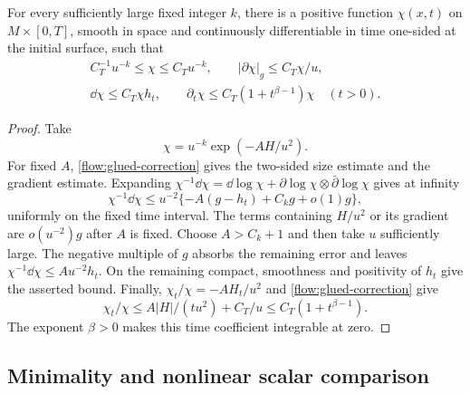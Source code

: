 \begin{lemma}\label{flow:cutoff-lemma}
For every sufficiently large fixed integer $k$, there is a positive
function $\chi(x,t)$ on $M\times[0,T]$, smooth in space and continuously
differentiable in time one-sided at the initial surface, such that
\begin{equation}\label{flow:cutoff-bounds}
 \begin{gathered}
 C_T^{-1}u^{-k}\le\chi\le C_Tu^{-k},\qquad
 |\partial\chi|_g\le C_T\chi/u,\\
 \dd\chi\le C_T\chi h_t,
 \qquad \partial_t\chi\le C_T(1+t^{\beta-1})\chi
 \quad(t>0).
 \end{gathered}
\end{equation}
\end{lemma}

\begin{proof}
Take
\[
 \chi=u^{-k}\exp(-AH/u^2).
\]
For fixed $A$, \eqref{flow:glued-correction} gives the two-sided
size estimate and the gradient estimate.  Expanding
$\chi^{-1}\dd\chi=\dd\log\chi+
\partial\log\chi\otimes\bar\partial\log\chi$ gives at infinity
\[
 \chi^{-1}\dd\chi
 \le u^{-2}\{-A(g-h_t)+C_kg+o(1)g\},
\]
uniformly on the fixed time interval.  The terms containing
$H/u^2$ or its gradient are $o(u^{-2})g$ after $A$ is fixed.
Choose $A>C_k+1$ and then take $u$ sufficiently large.  The negative
multiple of $g$ absorbs the remaining error and leaves
$\chi^{-1}\dd\chi\le Au^{-2}h_t$.  On the remaining compact,
smoothness and positivity of $h_t$ give the asserted bound.  Finally,
$\chi_t/\chi=-AH_t/u^2$ and \eqref{flow:glued-correction} give
\[
 \chi_t/\chi\le A|H|/(tu^2)+C_T/u
                  \le C_T(1+t^{\beta-1}).
\]
The exponent $\beta>0$ makes this time coefficient integrable at zero.
\end{proof}

\subsection{Minimality and nonlinear scalar comparison}

